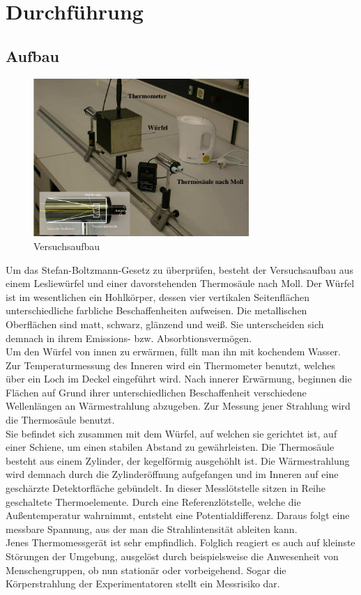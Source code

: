 \section{Durchführung}
\label{sec:Durchführung}
\subsection{Aufbau}
\begin{figure}[H]
  \centering
  \includegraphics[height=6cm]{Leslie.png}
  \caption{Versuchsaufbau \cite{sample}}
  \label{fig:skizze}
\end{figure}
Um das Stefan-Boltzmann-Gesetz zu überprüfen, besteht der Versuchsaufbau aus einem Lesliewürfel und einer davorstehenden Thermosäule nach Moll.
Der Würfel ist im wesentlichen ein Hohlkörper, dessen vier vertikalen Seitenflächen unterschiedliche farbliche Beschaffenheiten aufweisen.
Die metallischen Oberflächen sind matt, schwarz, glänzend und weiß.
Sie unterscheiden sich demnach in ihrem Emissions- bzw. Absorbtionsvermögen.\\
Um den Würfel von innen zu erwärmen, füllt man ihn mit kochendem Wasser.
Zur Temperaturmessung des Inneren wird ein Thermometer benutzt, welches über ein Loch im Deckel eingeführt wird.
Nach innerer Erwärmung, beginnen die Flächen auf Grund ihrer unterschiedlichen Beschaffenheit verschiedene Wellenlängen an Wärmestrahlung abzugeben.
Zur Messung jener Strahlung wird die Thermosäule benutzt.\\
Sie befindet sich zusammen mit dem Würfel, auf welchen sie gerichtet ist, auf einer Schiene, um einen stabilen Abstand zu gewährleisten.
Die Thermosäule besteht aus einem Zylinder, der kegelförmig ausgehöhlt ist.
Die Wärmestrahlung wird demnach durch die Zylinderöffnung aufgefangen und im Inneren auf eine geschärzte Detektorfläche gebündelt.
In dieser Messlötstelle sitzen in Reihe geschaltete Thermoelemente.
Durch eine Referenzlötstelle, welche die Außentemperatur wahrnimmt, entsteht eine Potentialdifferenz.
Daraus folgt eine messbare Spannung, aus der man die Strahlintensität ableiten kann.\\
Jenes Thermomessgerät ist sehr empfindlich.
Folglich reagiert es auch auf kleinste Störungen der Umgebung, ausgelöst durch beispielsweise die Anwesenheit von Menschengruppen, ob nun stationär oder vorbeigehend.
Sogar die Körperstrahlung der Experimentatoren stellt ein Messrisiko dar.

